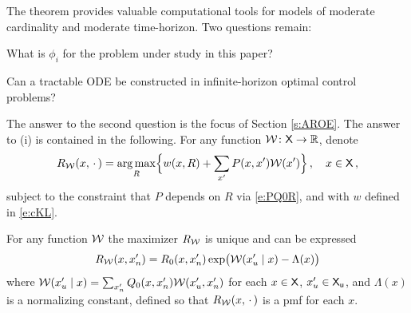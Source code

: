 \documentclass[final,12pt]{colt2018} %
\def\reward{w}
\def\argmax{\mathop{\rm arg\, max}}
\def\state{{\sf X}}
\def\stateu{{\sf X}_{\sf u}}
\newcommand{\field}[1]{\mathbb{#1}}
\def\Re{\field{R}}
\def\clW{{\cal W}}
\def\varble{\,\cdot\,}
\newcounter{rmnumx}
\newenvironment{romannumx}{\begin{list}{{\upshape (\roman{rmnumx})}}{\usecounter{rmnumx}
\setlength{\leftmargin}{2pt}
\setlength{\rightmargin}{4pt}
\setlength{\itemsep}{3pt}
\setlength{\itemindent}{18pt}
}}{\end{list}}
\def\Re{\field{R}}
\begin{document}
The theorem provides valuable computational tools for models of moderate 
cardinality and moderate time-horizon.  
Two questions remain:
\begin{romannumx}
\item   What is $\phi_i$ for the problem under study in this paper?
\item  Can a tractable ODE be constructed in infinite-horizon optimal control problems?
\end{romannumx}
The answer to the second question is the focus of Section \ref{s:AROE}.  %
%
The answer to (i) is contained in the following.   For any function $\clW \colon\state\to\Re$, denote
\[
R_\clW(x,\varble) = \argmax_R  \Bigl\{ \reward(x,R) +\sum_{x'} P(x,x') \clW(x') \Bigr\}\,,\quad x\in\state\, ,
\]
subject to the constraint that $P$ depends on $R$ via \eqref{e:PQ0R}, and with $\reward$ defined in \eqref{e:cKL}.
 

\begin{proposition}
\label{t:phiR}  
For any function $\clW $ the maximizer $R_\clW$ is unique and can be expressed
\[
R_\clW(x,x_n') = R_0(x,x_n')  \exp\bigl(  \clW(x'_u\mid  x)  -   \Lambda(x)    \bigr) 
\]
where  $\clW(x'_u\mid  x)  =  \sum_{x_n'} Q_0(x,x_n') \clW(x_u',x_n')$  for each $ x\in\state$, $x_u'\in\stateu$,
and $\Lambda(x)$ is a normalizing constant, defined so that $R_\clW(x,\varble)$ is a pmf for each $x$.
\end{proposition}


%
\end{document}
